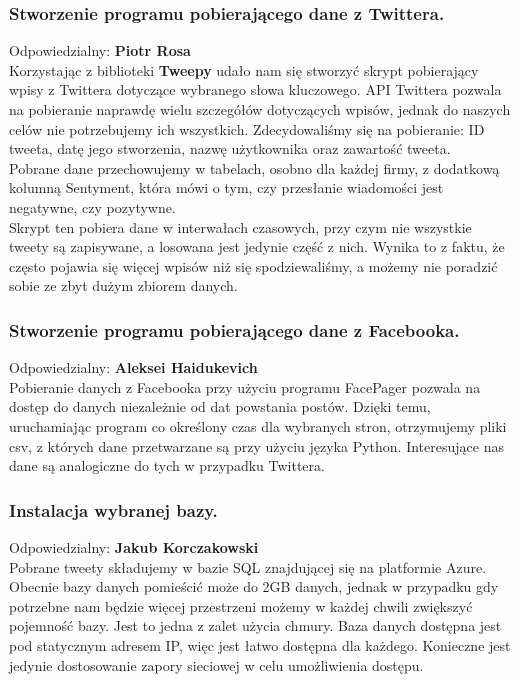 \documentclass[a4paper,11pt, notitlepage ]{article}
\begin{document}
    \subsubsection{Stworzenie programu pobierającego dane z Twittera.}
    Odpowiedzialny: \textbf{Piotr Rosa}\\
    Korzystając z biblioteki \textbf{Tweepy} udało nam się stworzyć skrypt pobierający wpisy z Twittera dotyczące wybranego słowa kluczowego. API Twittera pozwala na pobieranie naprawdę wielu szczegółów dotyczących wpisów, jednak do naszych celów nie potrzebujemy ich wszystkich. Zdecydowaliśmy się na pobieranie: ID tweeta, datę jego stworzenia, nazwę użytkownika oraz zawartość tweeta.\\
    Pobrane dane przechowujemy w tabelach, osobno dla każdej firmy, z dodatkową kolumną Sentyment, która mówi o tym, czy przesłanie wiadomości jest negatywne, czy pozytywne.\\
    Skrypt ten pobiera dane w interwałach czasowych, przy czym nie wszystkie tweety są zapisywane, a losowana jest jedynie część z nich. Wynika to z faktu, że często pojawia się więcej wpisów niż się spodziewaliśmy, a możemy nie poradzić sobie ze zbyt dużym zbiorem danych.
    \subsubsection{Stworzenie programu pobierającego dane z Facebooka.}
    Odpowiedzialny: \textbf{Aleksei Haidukevich}\\
    Pobieranie danych z Facebooka przy użyciu programu FacePager pozwala na dostęp do danych niezależnie od dat powstania postów. Dzięki temu, uruchamiając program co określony czas dla wybranych stron, otrzymujemy pliki csv, z których dane przetwarzane są przy użyciu języka Python. Interesujące nas dane są analogiczne do tych w przypadku Twittera.
    \subsubsection{Instalacja wybranej bazy.}
    Odpowiedzialny: \textbf{Jakub Korczakowski}\\
    Pobrane tweety składujemy w bazie SQL znajdującej się na platformie Azure. Obecnie bazy danych pomieścić może do 2GB danych, jednak w przypadku gdy potrzebne nam będzie więcej przestrzeni możemy w każdej chwili zwiększyć pojemność bazy. Jest to jedna z zalet użycia chmury. Baza danych dostępna jest pod statycznym adresem IP, więc jest łatwo dostępna dla każdego. Konieczne jest jedynie dostosowanie zapory sieciowej w celu umożliwienia dostępu.
\end{document}
